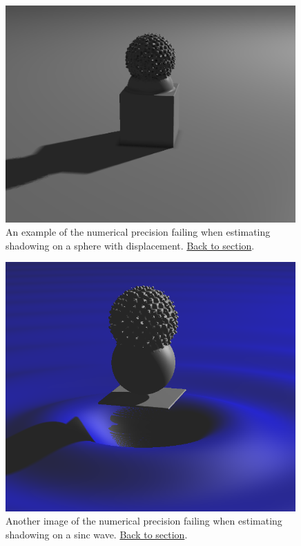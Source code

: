 \documentclass[abstract=off,oneside]{scrreprt}
\begin{document}
\begin{figure}[htb]
\centering
\includegraphics[width=0.99\textwidth]{./img/instability.png}
\caption*{\label{fig:instability}An example of the numerical precision failing when estimating shadowing on a sphere with displacement. \hyperref[sec:water]{Back to section}.}
\end{figure}

\begin{figure}[htb]
\centering
\includegraphics[width=0.99\textwidth]{./img/instability2.png}
\caption*{\label{fig:instability2}Another image of the numerical precision failing when estimating shadowing on a sinc wave. \hyperref[sec:water]{Back to section}.}
\end{figure}
\end{document}
